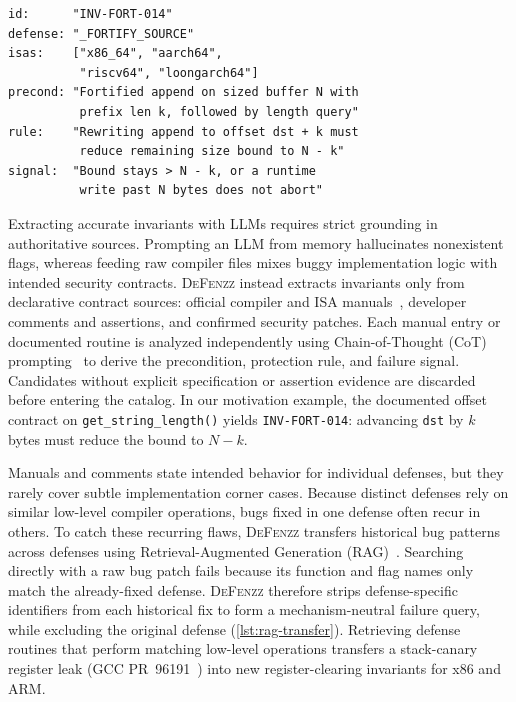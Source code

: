 \documentclass[conference,compsoc]{IEEEtran}
\begin{document}
\par\vspace{5pt}\noindent\begin{minipage}{\columnwidth}
\begin{lstlisting}[language={}, keepspaces=true, morekeywords={id,defense,isas,precond,rule,signal}, morecomment={[l]{\#}}, morestring={[b]"}, numbers=none, xleftmargin=3pt, framexleftmargin=0pt, caption={Structured security invariant record for \texttt{INV-FORT-014}.}, label={lst:invariant-record}]
id:      "INV-FORT-014"
defense: "_FORTIFY_SOURCE"
isas:    ["x86_64", "aarch64",
          "riscv64", "loongarch64"]
precond: "Fortified append on sized buffer N with
          prefix len k, followed by length query"
rule:    "Rewriting append to offset dst + k must
          reduce remaining size bound to N - k"
signal:  "Bound stays > N - k, or a runtime
          write past N bytes does not abort"
\end{lstlisting}
\end{minipage}\par\vspace{5pt}

Extracting accurate invariants with LLMs requires strict grounding in authoritative sources. Prompting an LLM from memory hallucinates nonexistent flags, whereas feeding raw compiler files mixes buggy implementation logic with intended security contracts. \textsc{DeFenzz} instead extracts invariants only from declarative contract sources: official compiler and ISA manuals~\cite{gcc15instrumentation,glibcfortify,arm_aapcs64,riscvpsabi}, developer comments and assertions, and confirmed security patches. Each manual entry or documented routine is analyzed independently using Chain-of-Thought (CoT) prompting~\cite{wei2022chain} to derive the precondition, protection rule, and failure signal. Candidates without explicit specification or assertion evidence are discarded before entering the catalog. In our motivation example, the documented offset contract on \texttt{get\_string\_length()} yields \texttt{INV-FORT-014}: advancing \texttt{dst} by $k$ bytes must reduce the bound to $N - k$.

Manuals and comments state intended behavior for individual defenses, but they rarely cover subtle implementation corner cases. Because distinct defenses rely on similar low-level compiler operations, bugs fixed in one defense often recur in others. To catch these recurring flaws, \textsc{DeFenzz} transfers historical bug patterns across defenses using Retrieval-Augmented Generation (RAG)~\cite{lewis2020retrieval,liu2025propertygpt}. Searching directly with a raw bug patch fails because its function and flag names only match the already-fixed defense. \textsc{DeFenzz} therefore strips defense-specific identifiers from each historical fix to form a mechanism-neutral failure query, while excluding the original defense (\autoref{lst:rag-transfer}). Retrieving defense routines that perform matching low-level operations transfers a stack-canary register leak (GCC PR~96191~\cite{gccpr96191}) into new register-clearing invariants for x86 and ARM.
\end{document}
